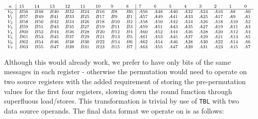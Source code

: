 \[
    \scriptsize
    \begin{array}{c|llllllll|llllllll}
        n & 15 & 14 & 13 & 12 & 11 & 10 & 9 & 8 & 7 & 6 & 5 & 4 & 3 & 2 & 1 & 0 \\
        \hline
        V_0 & B56 & B48 & B40 & B32 & B24 & B16 & B8  & B0 & A56 & A48 & A40 & A32 & A24 & A16 & A8  & A0 \\
        V_1 & B57 & B49 & B41 & B33 & B25 & B17 & B9  & B1 & A57 & A49 & A41 & A33 & A25 & A17 & A9  & A1 \\
        V_2 & B58 & B50 & B42 & B34 & B26 & B18 & B10 & B2 & A58 & A50 & A42 & A34 & A26 & A18 & A10 & A2 \\
        V_3 & B59 & B51 & B43 & B35 & B27 & B19 & B11 & B3 & A59 & A51 & A43 & A35 & A27 & A19 & A11 & A3 \\
        V_4 & B60 & B52 & B44 & B36 & B28 & B20 & B12 & B4 & A60 & A52 & A44 & A36 & A28 & A20 & A12 & A4 \\
        V_5 & B61 & B53 & B45 & B37 & B29 & B21 & B13 & B5 & A61 & A53 & A45 & A37 & A29 & A21 & A13 & A5 \\
        V_6 & B62 & B54 & B46 & B38 & B30 & B22 & B14 & B6 & A62 & A54 & A46 & A38 & A30 & A22 & A14 & A6 \\
        V_7 & B63 & B55 & B47 & B39 & B31 & B23 & B15 & B7 & A63 & A55 & A47 & A39 & A31 & A23 & A15 & A7
    \end{array}
\]

Although this would already work, we prefer to have only bits of the same
messages in each register - otherwise the permutation would need to operate on
two source registers with the added requirement of storing the pre-permutation
values for the first four registers, slowing down the round function through
superfluous load/stores. This transformation is trivial by use of
\texttt{TBL} with two data source operands. The final data format we operate on
is as follows:

